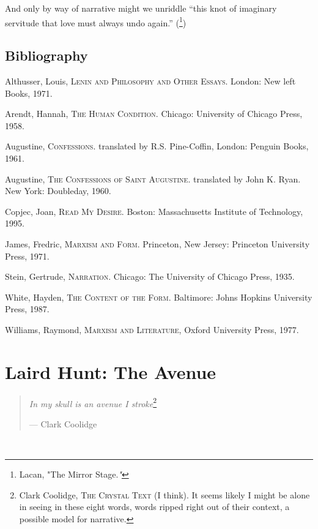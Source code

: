\documentclass[
]{memoir}
\begin{document}
And only by way of narrative might we unriddle ``this knot of imaginary
servitude that love must always undo again.'' (\footnote{Lacan, "The
  Mirror Stage.\emph{"}})

\hypertarget{bibliography}{%
\section*{Bibliography}\label{bibliography}}

Althusser, Louis, \textsc{Lenin and Philosophy and Other Essays}.
London: New left Books, 1971.

Arendt, Hannah, \textsc{The Human Condition}. Chicago: University of
Chicago Press, 1958.

Augustine, \textsc{Confessions}. translated by R.S. Pine-Coffin, London:
Penguin Books, 1961.

Augustine, \textsc{The Confessions of Saint Augustine}. translated by
John K. Ryan. New York: Doubleday, 1960.

Copjec, Joan, \textsc{Read My Desire}. Boston: Massachusetts Institute
of Technology, 1995.

James, Fredric, \textsc{Marxism and Form}. Princeton, New Jersey:
Princeton University Press, 1971.

Stein, Gertrude, \textsc{Narration}. Chicago: The University of Chicago
Press, 1935.

White, Hayden, \textsc{The Content of the Form}. Baltimore: Johns
Hopkins University Press, 1987.

Williams, Raymond, \textsc{Marxism and Literature}, Oxford University
Press, 1977.

\hypertarget{laird-hunt-the-avenue}{%
\chapter{Laird Hunt: The Avenue}\label{laird-hunt-the-avenue}}

\begin{quote}
\emph{In my skull is an avenue I stroke}\footnote{Clark Coolidge,
  \textsc{The Crystal Text} (I think). It seems likely I might be alone
  in seeing in these eight words, words ripped right out of their
  context, a possible model for narrative.}

--- Clark Coolidge
\end{quote}

~
\end{document}
